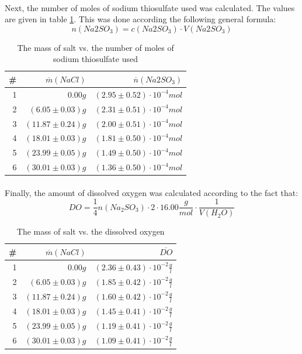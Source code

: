 \documentclass[a4paper]{article}
\begin{document}
\paragraph*{}
Next, the number of moles of sodium thiosulfate used was calculated. The values
are given in table \ref{tbl:calc-na2so3-moles}. This was done according the
following general formula:
$$n(Na2SO_3) = c(Na2SO_3) \cdot V(Na2SO_3)$$
\begin{table}[ht]
  \center
  \begin{tabular}{ r | r | r }
    \# & $\overline{m}(NaCl)$ & $\overline{n}(Na2SO_3)$ \\ \hline \hline
    1 & $0.00 \si{g}$ & $(2.95 \pm 0.52) \cdot 10^{-4} \si{mol}$ \\ \hline
    2 & $(6.05 \pm 0.03) \si{g}$ & $(2.31 \pm 0.51) \cdot 10^{-4} \si{mol}$ \\ \hline
    3 & $(11.87 \pm 0.24) \si{g}$ & $(2.00 \pm 0.51) \cdot 10^{-4} \si{mol}$ \\ \hline
    4 & $(18.01 \pm 0.03) \si{g}$ & $(1.81 \pm 0.50) \cdot 10^{-4} \si{mol}$ \\ \hline
    5 & $(23.99 \pm 0.05) \si{g}$ & $(1.49 \pm 0.50) \cdot 10^{-4} \si{mol}$ \\ \hline
    6 & $(30.01 \pm 0.03) \si{g}$ & $(1.36 \pm 0.50) \cdot 10^{-4} \si{mol}$ \\ \hline
  \end{tabular}
  \caption{The mass of salt vs. the number of moles of sodium thiosulfate used
  \label{tbl:calc-na2so3-moles}}
\end{table}

\paragraph*{}
Finally, the amount of dissolved oxygen was calculated according to the fact
that:
$$DO = \frac{1}{4} n(Na_2SO_3) \cdot 2 \cdot 16.00 \si{\frac{g}{mol}} \cdot
\frac{1}{V(H_2O)}$$
\begin{table}[ht]
  \center
  \begin{tabular}{ r | r | r }
    \# & $\overline{m}(NaCl)$ & $\overline{DO}$ \\ \hline \hline
    1 & $0.00 \si{g}$ & $(2.36 \pm 0.43) \cdot 10^{-2} \si{\frac{g}{l}}$ \\ \hline
    2 & $(6.05 \pm 0.03) \si{g}$ & $(1.85 \pm 0.42) \cdot 10^{-2} \si{\frac{g}{l}}$ \\ \hline
    3 & $(11.87 \pm 0.24) \si{g}$ & $(1.60 \pm 0.42) \cdot 10^{-2} \si{\frac{g}{l}}$ \\ \hline
    4 & $(18.01 \pm 0.03) \si{g}$ & $(1.45 \pm 0.41) \cdot 10^{-2} \si{\frac{g}{l}}$ \\ \hline
    5 & $(23.99 \pm 0.05) \si{g}$ & $(1.19 \pm 0.41) \cdot 10^{-2} \si{\frac{g}{l}}$ \\ \hline
    6 & $(30.01 \pm 0.03) \si{g}$ & $(1.09 \pm 0.41) \cdot 10^{-2} \si{\frac{g}{l}}$ \\ \hline
  \end{tabular}
  \caption{The mass of salt vs. the dissolved oxygen
  \label{tbl:calc-do}}
\end{table}
\end{document}
